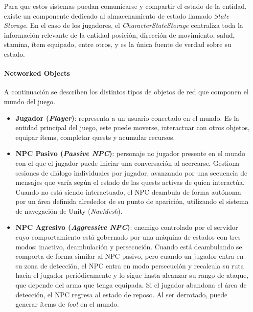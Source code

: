 \vspace{0.25cm}

Para que estos sistemas puedan comunicarse y compartir el estado de la entidad, existe un componente dedicado al almacenamiento de estado llamado
\textit{State Storage}. En el caso de los jugadores, el \textit{CharacterStateStorage} centraliza toda la información relevante de la entidad
posición, dirección de movimiento, salud, stamina, ítem equipado, entre otros, y es la única fuente de verdad sobre su estado.

\paragraph{Networked Objects}
A continuación se describen los distintos tipos de objetos de red que componen el mundo del juego.
\begin{itemize}
    \item \textbf{Jugador (\textit{Player})}:
    representa a un usuario conectado en el mundo. Es la entidad principal del juego, este puede moverse, interactuar con otros objetos, 
    equipar ítems, completar quests y acumular recursos.

    \item \textbf{NPC Pasivo (\textit{Passive NPC})}: personaje no jugador presente en el
    mundo con el que el jugador puede iniciar una conversación al acercarse. Gestiona
    sesiones de diálogo individuales por jugador, avanzando por una secuencia de mensajes
    que varía según el estado de las quests activas de quien interactúa. Cuando no está siendo interactuado,
    el NPC deambula de forma autónoma por un área definida alrededor de su punto de aparición, utilizando el sistema
    de navegación de Unity (\textit{NavMesh}).

    \item \textbf{NPC Agresivo (\textit{Aggressive NPC})}: enemigo controlado por el
    servidor cuyo comportamiento está gobernado por una máquina de estados con tres modos:
    inactivo, deambulación y persecución. Cuando está deambulando se comporta de forma
    similar al NPC pasivo, pero cuando un jugador entra
    en su zona de detección, el NPC entra en modo persecución y recalcula su ruta hacia el
    jugador periódicamente y lo sigue hasta alcanzar su rango de ataque, que depende del
    arma que tenga equipada. Si el jugador abandona el área de detección, el NPC regresa
    al estado de reposo. Al ser derrotado, puede generar ítems de \textit{loot} en el mundo.



\end{itemize}
